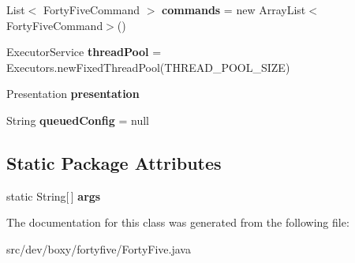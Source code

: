 \begin{DoxyCompactItemize}
\item 
\hypertarget{classdev_1_1boxy_1_1fortyfive_1_1_forty_five_a0d2c01297e1b614a5097a5c67ad5763f}{
List$<$ FortyFiveCommand $>$ {\bfseries commands} = new ArrayList$<$FortyFiveCommand$>$()}
\label{de/df3/classdev_1_1boxy_1_1fortyfive_1_1_forty_five_a0d2c01297e1b614a5097a5c67ad5763f}

\item 
\hypertarget{classdev_1_1boxy_1_1fortyfive_1_1_forty_five_af5e58456ffb75331873ff96bca9b9a1b}{
ExecutorService {\bfseries threadPool} = Executors.newFixedThreadPool(THREAD\_\-POOL\_\-SIZE)}
\label{de/df3/classdev_1_1boxy_1_1fortyfive_1_1_forty_five_af5e58456ffb75331873ff96bca9b9a1b}

\item 
\hypertarget{classdev_1_1boxy_1_1fortyfive_1_1_forty_five_af7bb1987d85e8c950e0ad3153c649943}{
Presentation {\bfseries presentation}}
\label{de/df3/classdev_1_1boxy_1_1fortyfive_1_1_forty_five_af7bb1987d85e8c950e0ad3153c649943}

\item 
\hypertarget{classdev_1_1boxy_1_1fortyfive_1_1_forty_five_aa1a40ee8c1a433d542dc9754ef1d7628}{
String {\bfseries queuedConfig} = null}
\label{de/df3/classdev_1_1boxy_1_1fortyfive_1_1_forty_five_aa1a40ee8c1a433d542dc9754ef1d7628}

\end{DoxyCompactItemize}
\subsection*{Static Package Attributes}
\begin{DoxyCompactItemize}
\item 
\hypertarget{classdev_1_1boxy_1_1fortyfive_1_1_forty_five_a4f72ea362cdb3e0ab068d25755a70a0f}{
static String\mbox{[}$\,$\mbox{]} {\bfseries args}}
\label{de/df3/classdev_1_1boxy_1_1fortyfive_1_1_forty_five_a4f72ea362cdb3e0ab068d25755a70a0f}

\end{DoxyCompactItemize}


The documentation for this class was generated from the following file:\begin{DoxyCompactItemize}
\item 
src/dev/boxy/fortyfive/FortyFive.java\end{DoxyCompactItemize}
